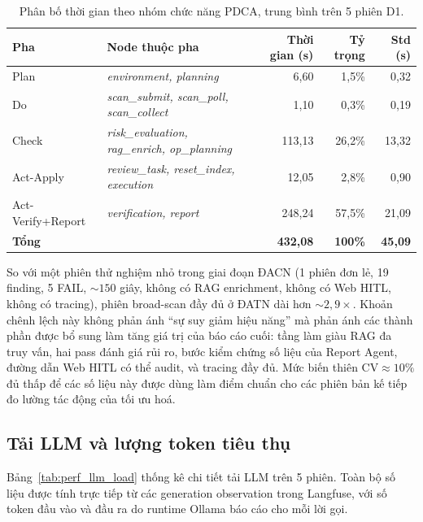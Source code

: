 \begin{table}[!htb]
  \centering
  \caption{Phân bố thời gian theo nhóm chức năng PDCA, trung bình trên 5 phiên D1.}
  \label{tab:pdca_phase_breakdown}
  \small
  \begin{tabular}{llrrr}
    \toprule
    \textbf{Pha} & \textbf{Node thuộc pha} & \textbf{Thời gian (s)} & \textbf{Tỷ trọng} & \textbf{Std (s)} \\
    \midrule
    Plan      & \textit{environment, planning}                        & 6{,}60  & 1{,}5\%  & 0{,}32 \\
    Do        & \textit{scan\_submit, scan\_poll, scan\_collect}      & 1{,}10  & 0{,}3\%  & 0{,}19 \\
    Check     & \textit{risk\_evaluation, rag\_enrich, op\_planning}  & 113{,}13 & 26{,}2\% & 13{,}32 \\
    Act-Apply & \textit{review\_task, reset\_index, execution}        & 12{,}05 & 2{,}8\%  & 0{,}90 \\
    Act-Verify+Report & \textit{verification, report}                 & 248{,}24 & 57{,}5\% & 21{,}09 \\
    \midrule
    \textbf{Tổng} &                                                  & \textbf{432{,}08} & \textbf{100\%} & \textbf{45{,}09} \\
    \bottomrule
  \end{tabular}
\end{table}

So với một phiên thử nghiệm nhỏ trong giai đoạn ĐACN (1 phiên đơn lẻ, 19 finding, 5 FAIL, $\sim 150$ giây, không có RAG enrichment, không có Web HITL, không có tracing), phiên broad-scan đầy đủ ở ĐATN dài hơn $\sim 2{,}9\times$. Khoản chênh lệch này không phản ánh ``sự suy giảm hiệu năng'' mà phản ánh các thành phần được bổ sung làm tăng giá trị của báo cáo cuối: tầng làm giàu RAG đa truy vấn, hai pass đánh giá rủi ro, bước kiểm chứng số liệu của Report Agent, đường dẫn Web HITL có thể audit, và tracing đầy đủ. Mức biến thiên $\text{CV} \approx 10\%$ đủ thấp để các số liệu này được dùng làm điểm chuẩn cho các phiên bản kế tiếp đo lường tác động của tối ưu hoá.

\subsection{Tải LLM và lượng token tiêu thụ}
\label{subsec:perf_llm_load}

Bảng~\ref{tab:perf_llm_load} thống kê chi tiết tải LLM trên 5 phiên. Toàn bộ số liệu được tính trực tiếp từ các generation observation trong Langfuse, với số token đầu vào và đầu ra do runtime Ollama báo cáo cho mỗi lời gọi.

